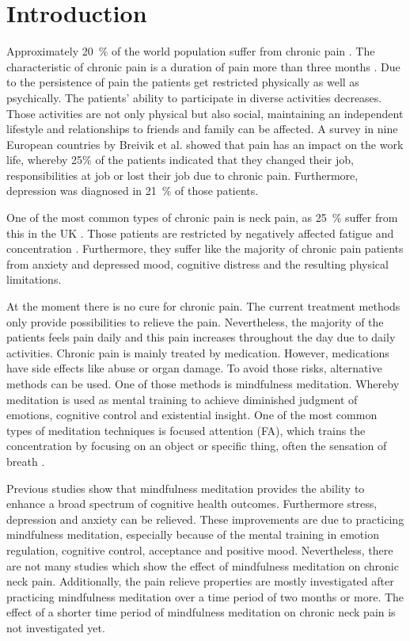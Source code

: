 \section{Introduction}
Approximately 20~\% of the world population suffer from chronic pain \cite{Macfarlanea2016}. The characteristic of chronic pain is a duration of pain more than three months \cite{Mello2016}. Due to the persistence of pain the patients get restricted physically as well as psychically. The patients’ ability to participate in diverse activities decreases. Those activities are not only physical but also social, maintaining an independent lifestyle and relationships to friends and family can be affected. A survey in nine European countries by Breivik et al. \cite{Breivik2006} showed that pain has an impact on the work life, whereby 25\% of the patients indicated that they changed their job, responsibilities at job or lost their job due to chronic pain. Furthermore, depression was diagnosed in 21~\% of those patients. \cite{Breivik2006} 

One of the most common types of chronic pain is neck pain, as 25~\% suffer from this in the UK \cite{Macfarlanea2016}. Those patients are restricted by negatively affected fatigue and concentration \cite{vanRanderaat2016}. Furthermore, they suffer like the majority of chronic pain patients from anxiety and depressed mood, cognitive distress and the resulting physical limitations. \cite{Gross2013} 

At the moment there is no cure for chronic pain. The current treatment methods only provide possibilities to relieve the pain. \cite{Pope2017,marcus2009} Nevertheless, the majority of the patients feels pain daily and this pain increases throughout the day due to daily activities. \cite{Breivik2006} 
Chronic pain is mainly treated by medication. However, medications have side effects like abuse or organ damage. To avoid those risks, alternative methods can be used. One of those methods is mindfulness meditation. Whereby meditation is used as mental training to achieve diminished judgment of emotions, cognitive control and existential insight. \cite{marcus2009} One of the most common types of meditation techniques is focused attention (FA), which trains the concentration by focusing on an object or specific thing, often the sensation of breath \cite{Zeidan2016}. 

Previous studies show that mindfulness meditation provides the ability to enhance a broad spectrum of cognitive health outcomes. Furthermore stress, depression and anxiety can be relieved. These improvements are due to practicing mindfulness meditation, especially because of the mental training in emotion regulation, cognitive control, acceptance and positive mood. \cite{marcus2009,Zeidan2012} Nevertheless, there are not many studies which show the effect of mindfulness meditation on chronic neck pain. \cite{Macfarlanea2016} Additionally, the pain relieve properties are mostly investigated after practicing mindfulness meditation over a time period of two months or more. The effect of a shorter time period of mindfulness meditation on chronic neck pain is not investigated yet. 


